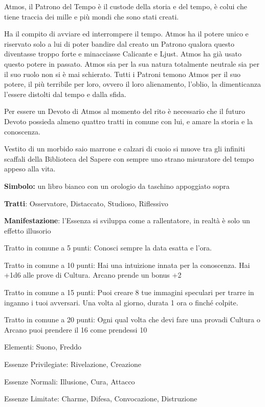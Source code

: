 \documentclass[a4paper,11pt,twoside,openany]{book}
\begin{document}
Atmos, il Patrono del Tempo è il custode della storia e del tempo, è colui che tiene traccia dei mille e più mondi che sono stati creati.

Ha il compito di avviare ed interrompere il tempo. Atmos ha il potere unico e riservato solo a lui di poter bandire dal creato un Patrono qualora questo diventasse troppo forte e minacciasse Calicante e Ljust. Atmos ha già usato questo potere in passato. Atmos sia per la sua natura totalmente neutrale sia per il suo ruolo non si è mai schierato. Tutti i Patroni temono Atmos per il suo potere, il più terribile per loro, ovvero il loro alienamento, l'oblio, la dimenticanza l'essere distolti dal tempo e dalla sfida.

Per essere un Devoto di Atmos al momento del rito è necessario che il futuro Devoto possieda almeno quattro tratti in comune con lui, e amare la storia e la conoscenza.

Vestito di un morbido saio marrone e calzari di cuoio si muove tra gli infiniti scaffali della Biblioteca del Sapere con sempre uno strano misuratore del tempo appeso alla vita.

\textbf{Simbolo:} un libro bianco con un orologio da taschino appoggiato
sopra

\textbf{Tratti}: Osservatore, Distaccato, Studioso, Riflessivo

\textbf{Manifestazione}: l'Essenza si sviluppa come a rallentatore, in realtà è solo un effetto illusorio

\bigskip

Tratto in comune a 5 punti: Conosci sempre la data esatta e l'ora.

Tratto in comune a 10 punti: Hai una intuizione innata per la conoscenza. Hai +1d6 alle prove di Cultura. Arcano prende un bonus +2

Tratto in comune a 15 punti: Puoi creare 8 tue immagini speculari per trarre in inganno i tuoi avversari. Una volta al giorno, durata 1 ora o finché colpite.

Tratto in comune a 20 punti: Ogni qual volta che devi fare una provadi Cultura o Arcano puoi prendere il 16 come prendessi 10

\bigskip

Elementi: Suono, Freddo

\bigskip

Essenze Privilegiate: Rivelazione, Creazione

Essenze Normali: Illusione, Cura, Attacco

Essenze Limitate: Charme, Difesa, Convocazione, Distruzione
\end{document}

